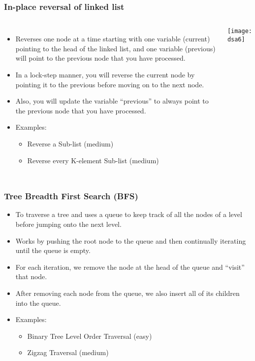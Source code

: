 \begin{frame}[fragile]
	\frametitle{In-place reversal of linked list}
	\begin{columns}[T]
			\begin{itemize}
			\item Reverses one node at a time starting with one variable (current) pointing to the head of the linked list, and one variable (previous) will point to the previous node that you have processed. 
			\item In a lock-step manner, you will reverse the current node by pointing it to the previous before moving on to the next node. 
			\item Also, you will update the variable “previous” to always point to the previous node that you have processed.
				\item Examples:
			\begin{itemize}
				\item Reverse a Sub-list (medium)
				\item Reverse every K-element Sub-list (medium)
			\end{itemize}

			\end{itemize}
			
		
\begin{center}
\texttt{[image: dsa6]}
\end{center}		
		\end{columns}		
\end{frame}

\begin{frame}[fragile]
	\frametitle{Tree Breadth First Search (BFS)}
		
			\begin{itemize}
			\item To traverse a tree and uses a queue to keep track of all the nodes of a level before jumping onto the next level.
			\item Works by pushing the root node to the queue and then continually iterating until the queue is empty. 
			\item For each iteration, we remove the node at the head of the queue and “visit” that node. 
			\item After removing each node from the queue, we also insert all of its children into the queue.
				\item Examples:
			\begin{itemize}
				\item Binary Tree Level Order Traversal (easy)
				\item Zigzag Traversal (medium)
			\end{itemize}

			\end{itemize}	
\end{frame}

